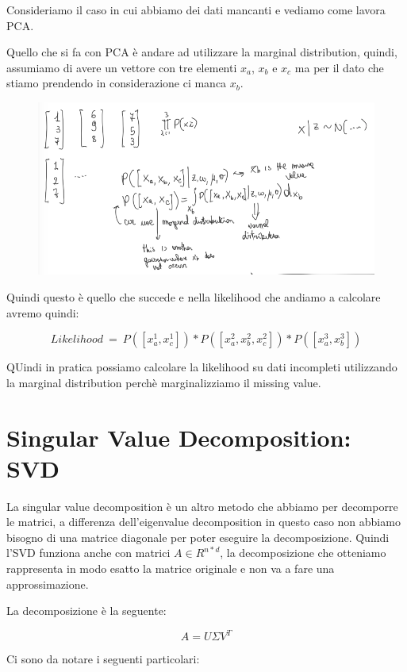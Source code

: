 \documentclass[14pt]{extreport}
\begin{document}
Consideriamo il caso in cui abbiamo dei dati mancanti e vediamo come lavora PCA.

Quello che si fa con PCA è andare ad utilizzare la marginal distribution, quindi, assumiamo di avere un vettore con tre elementi $x_a$, $x_b$ e $x_c$
ma per il dato che stiamo prendendo in considerazione ci manca $x_b$.


\begin{figure}[H]
	\centering
	\includegraphics[width=0.7\linewidth]{494.jpeg}
\end{figure}

Quindi questo è quello che succede e nella likelihood che andiamo a calcolare avremo quindi:

$$Likelihood \ = \ P([x_a^1,x_c^1])*P([x_a^2, x_b^2, x_c^2]) * P([x_a^3,x_b^3])$$

QUindi in pratica possiamo calcolare la likelihood su dati incompleti utilizzando la marginal distribution perchè marginalizziamo il missing value.


\section{Singular Value Decomposition: SVD}

La singular value decomposition è un altro metodo che abbiamo per decomporre le matrici, a differenza dell'eigenvalue decomposition in questo caso non
abbiamo bisogno di una matrice diagonale per poter eseguire la decomposizione. Quindi l'SVD funziona anche con matrici $A \in R^{n*d}$, la
decomposizione che otteniamo rappresenta in modo esatto la matrice originale e non va a fare una approssimazione.

La decomposizione è la seguente:

$$A = U \Sigma V^T$$

Ci sono da notare i seguenti particolari:
\end{document}
